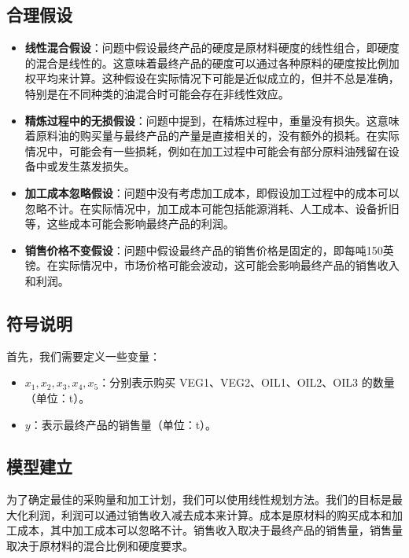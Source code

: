 \documentclass[a4,10pt,zihao=-4]{ctexart}
\begin{document}
\subsection{合理假设}
\begin{itemize}
    \item \textbf{线性混合假设}：问题中假设最终产品的硬度是原材料硬度的线性组合，即硬度的混合是线性的。这意味着最终产品的硬度可以通过各种原料的硬度按比例加权平均来计算。这种假设在实际情况下可能是近似成立的，但并不总是准确，特别是在不同种类的油混合时可能会存在非线性效应。

    \item \textbf{精炼过程中的无损假设}：问题中提到，在精炼过程中，重量没有损失。这意味着原料油的购买量与最终产品的产量是直接相关的，没有额外的损耗。在实际情况中，可能会有一些损耗，例如在加工过程中可能会有部分原料油残留在设备中或发生蒸发损失。

    \item \textbf{加工成本忽略假设}：问题中没有考虑加工成本，即假设加工过程中的成本可以忽略不计。在实际情况中，加工成本可能包括能源消耗、人工成本、设备折旧等，这些成本可能会影响最终产品的利润。

    \item \textbf{销售价格不变假设}：问题中假设最终产品的销售价格是固定的，即每吨150英镑。在实际情况中，市场价格可能会波动，这可能会影响最终产品的销售收入和利润。
\end{itemize}

\subsection{符号说明}
首先，我们需要定义一些变量：
\begin{itemize}
    \item \( x_1, x_2, x_3, x_4, x_5 \)：分别表示购买 VEG1、VEG2、OIL1、OIL2、OIL3 的数量（单位：t）。
    \item \( y \)：表示最终产品的销售量（单位：t）。
\end{itemize}

\subsection{模型建立}

为了确定最佳的采购量和加工计划，我们可以使用线性规划方法。我们的目标是最大化利润，利润可以通过销售收入减去成本来计算。成本是原材料的购买成本和加工成本，其中加工成本可以忽略不计。销售收入取决于最终产品的销售量，销售量取决于原材料的混合比例和硬度要求。
\end{document}
